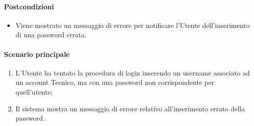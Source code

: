 \paragraph*{Postcondizioni}
\begin{itemize}
  \item Viene mostrato un messaggio di errore per notificare l’Utente dell'inserimento di una password errata.
\end{itemize}

\paragraph*{Scenario principale}
\begin{enumerate}
  \item L’Utente ha tentato la procedura di login inserendo un username associato ad un account Tecnico, ma con una password non corrispondente per quell'utente;
  \item Il sistema mostra un messaggio di errore relativo all'inserimento errato della password.   
\end{enumerate}

